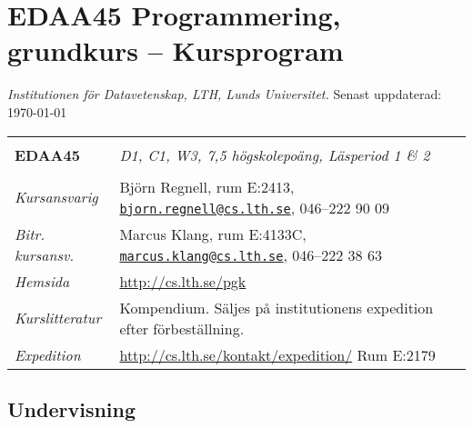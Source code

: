 \documentclass[a4paper,12pt,oneside]{memoir}
\newcommand{\YEAR}{\CurrentYear}
\begin{document}


\section*{EDAA45 Programmering, grundkurs  -- Kursprogram \YEAR}
\emph{Institutionen för Datavetenskap, LTH, Lunds Universitet.} Senast uppdaterad: \today\\

\begin{longtable}[l]{ll}
\hline\\[-0.75em]%

\textbf{EDAA45} & \textit {D1, C1, W3, 7,5 högskolepoäng, Läsperiod 1 \& 2} \\[-0.75em] \tabularnewline
\hline%
\endhead
\emph{Kursansvarig}   & Björn Regnell, rum E:2413,
                        \href{mailto:bjorn.regnell@cs.lth.se}
                        {\nolinkurl{bjorn.regnell@cs.lth.se}},
                        046--222 90 09\tabularnewline
\emph{Bitr. kursansv.}   & Marcus Klang, rum E:4133C,
                        \href{mailto:marcus.klang@cs.lth.se}
                        {\nolinkurl{marcus.klang@cs.lth.se}},
                        046--222 38 63\tabularnewline
                        \emph{Hemsida}        
                        & \url{http://cs.lth.se/pgk}\tabularnewline
\emph{Kurslitteratur} & Kompendium. Säljes på institutionens expedition efter förbeställning.\tabularnewline
\emph{Expedition}     & \url{http://cs.lth.se/kontakt/expedition/} Rum E:2179
                        \tabularnewline

\hline
\end{longtable}

\subsection{Undervisning}\label{undervisning}
\end{document}
